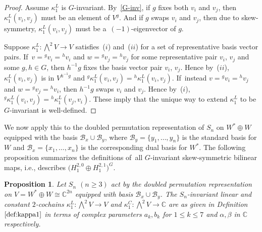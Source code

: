\documentclass[10pt,a4paper]{amsart}
\numberwithin{equation}{section}
\newtheorem{Proposition}[Theorem]{Proposition}
 { \theoremstyle{definition}
\newtheorem{Definition}[Theorem]{Definition}
\newtheorem{Remark}[Theorem]{Remark}
\newtheorem{case}{Case}}
\newcommand{\actby}[1]{{}^{#1}}
\begin{document}
\begin{proof}
Assume $\kappa^L_1$ is $G$-invariant. By~\eqref{G-inv}, if $g$ fixes both $v_i$ and $v_j$, then $\kappa^L_1(v_i,v_j)$ must be an element of $V^g$. And if $g$ swaps $v_i$ and $v_j$, then due to skew-symmetry, $\kappa^L_1(v_i,v_j)$ must
be a~$(-1)$-eigenvector of $g$.

Suppose $\kappa^L_1\colon \bigwedge^2 V\to V$ satisfies~($i$) and~($ii$) for a set of representative basis vector pairs. If~$v=\actby{g}v_i=\actby{h}v_i$ and $w=\actby{g}v_j=\actby{h}v_j$ for some representative pair $v_i$, $v_j$ and some $g, h \in G$, then $h^{-1}g$ fixes the basis vector pair $v_i$, $v_j$. Hence by~($ii$),
$\kappa^L_1(v_i,v_j)$ is in $V^{h^{-1}g}$ and $\actby{g}\kappa^L_1(v_i,v_j)=\actby{h}\kappa^L_1(v_i,v_j)$. If~instead $v=\actby{g}v_i=\actby{h}v_j$ and $w=\actby{g}v_j=\actby{h}v_i$, then $h^{-1}g$ swaps $v_i$ and $v_j$. Hence by~($i$),
$\actby{g}\kappa^L_1(v_i,v_j)=\actby{h}\kappa^L_1(v_j,v_i)$.
These imply that the unique way to extend $\kappa^L_1$ to be $G$-invariant is well-defined.
\end{proof}

We now apply this to the doubled permutation representation of $S_n$
on $W^*\oplus W$ equipped with the basis
$\mathcal{B}_x \cup \mathcal{B}_y$,
where $\mathcal{B}_y=\{y_1,\dots,y_n\}$ is the standard basis for $W$ and
$\mathcal{B}_x=\{x_1,\dots,x_n\}$ is the corresponding dual basis for $W^*$.
The following proposition summarizes the definitions
of~all $G$-invariant skew-symmetric bilinear maps, i.e., describes $\big(H_1^{2,0}\oplus H_1^{2,1}\big)^G$.

\begin{Proposition}
\label{prop:kappa1}
Let $S_n$ $(n \geq 3)$ act by the doubled permutation representation on $V=W^* \oplus W \cong \mathbb{C}^{2n}$ equipped with basis $\mathcal{B}_x \cup \mathcal{B}_y$.
The $S_n$-invariant linear and constant $2$-cochains
$\kappa^L_1\colon \bigwedge^2 V \to V$ and
$\kappa^C_1\colon \bigwedge^2 V\to \mathbb{C}$ are as given in Definition~$\ref{def:kappa1}$ in
terms of complex parameters $a_k, b_k$ for $1 \leq k \leq 7$ and $\alpha, \beta$ in $\mathbb{C}$ respectively.
\end{Proposition}
\end{document}
